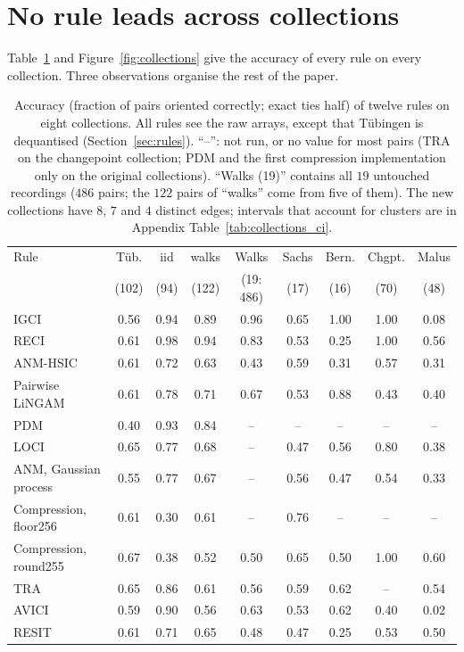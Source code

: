 \section{No rule leads across collections}\label{sec:coll}

Table~\ref{tab:collections2} and Figure~\ref{fig:collections} give the accuracy of every rule on every collection. Three observations organise the rest of the paper.

\begin{table}[t]
\caption{Accuracy (fraction of pairs oriented correctly; exact ties half) of twelve rules on eight collections. All rules see the raw arrays, except that T\"ubingen is dequantised (Section~\ref{sec:rules}). ``--'': not run, or no value for most pairs (TRA on the changepoint collection; PDM and the first compression implementation only on the original collections). ``Walks (19)'' contains all $19$ untouched recordings ($486$ pairs; the $122$ pairs of ``walks'' come from five of them). The new collections have $8$, $7$ and $4$ distinct edges; intervals that account for clusters are in Appendix Table~\ref{tab:collections_ci}.}
\label{tab:collections2}
\small
\setlength{\tabcolsep}{3.2pt}
\begin{tabular}{@{}lcccccccc@{}}
\toprule
Rule & T\"ub. & iid & walks & Walks & Sachs & Bern. & Chgpt. & Malus\\
 & (102) & (94) & (122) & (19: 486) & (17) & (16) & (70) & (48)\\
\midrule
IGCI & 0.56 & 0.94 & 0.89 & 0.96 & 0.65 & 1.00 & 1.00 & 0.08\\
RECI & 0.61 & 0.98 & 0.94 & 0.83 & 0.53 & 0.25 & 1.00 & 0.56\\
ANM-HSIC & 0.61 & 0.72 & 0.63 & 0.43 & 0.59 & 0.31 & 0.57 & 0.31\\
Pairwise LiNGAM & 0.61 & 0.78 & 0.71 & 0.67 & 0.53 & 0.88 & 0.43 & 0.40\\
PDM & 0.40 & 0.93 & 0.84 & -- & -- & -- & -- & --\\
LOCI & 0.65 & 0.77 & 0.68 & -- & 0.47 & 0.56 & 0.80 & 0.38\\
ANM, Gaussian process & 0.55 & 0.77 & 0.67 & -- & 0.56 & 0.47 & 0.54 & 0.33\\
Compression, floor256 & 0.61 & 0.30 & 0.61 & -- & 0.76 & -- & -- & --\\
Compression, round255 & 0.67 & 0.38 & 0.52 & 0.50 & 0.65 & 0.50 & 1.00 & 0.60\\
TRA & 0.65 & 0.86 & 0.61 & 0.56 & 0.59 & 0.62 & -- & 0.54\\
AVICI & 0.59 & 0.90 & 0.56 & 0.63 & 0.53 & 0.62 & 0.40 & 0.02\\
RESIT & 0.61 & 0.71 & 0.65 & 0.48 & 0.47 & 0.25 & 0.53 & 0.50\\
\bottomrule
\end{tabular}
\end{table}

